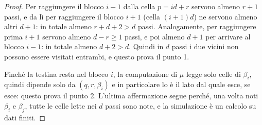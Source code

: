 \begin{proof}
Per raggiungere il blocco $i-1$ dalla cella $p=id+r$ servono almeno $r+1$ passi, e da lì per raggiungere il blocco $i+1$ (cella $(i+1)d$) ne servono almeno altri $d+1$: in totale almeno $r+d+2>d$ passi. Analogamente, per raggiungere prima $i+1$ servono almeno $d-r\geq 1$ passi, e poi almeno $d+1$ per arrivare al blocco $i-1$: in totale almeno $d+2>d$. Quindi in $d$ passi i due vicini non possono essere visitati entrambi, e questo prova il punto 1.

Finché la testina resta nel blocco $i$, la computazione di $\mu$ legge solo celle di $\beta_i$, quindi dipende solo da $(q,r,\beta_i)$ e in particolare lo è il lato dal quale esce, se esce: questo prova il punto 2. L'ultima affermazione segue perché, una volta noti $\beta_i$ e $\beta_j$, tutte le celle lette nei $d$ passi sono note, e la simulazione è un calcolo su dati finiti.
\end{proof}

